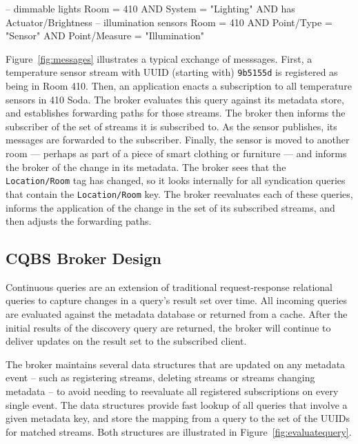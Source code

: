 \begin{sqlcode}
-- dimmable lights
Room = 410 AND System = "Lighting"
AND has Actuator/Brightness
-- illumination sensors
Room = 410 AND Point/Type = "Sensor"
AND Point/Measure = "Illumination"
\end{sqlcode}

Figure~\ref{fig:messages} illustrates a typical exchange of messsages.
First, a temperature sensor stream with UUID (starting with) \texttt{9b5155d} is registered as being in Room 410.
Then, an application enacts a subscription to all temperature sensors in 410 Soda.
The broker evaluates this query against its metadata store, and establishes forwarding paths for those streams.
The broker then informs the subscriber of the set of streams it is subscribed to.
As the sensor publishes, its messages are forwarded to the subscriber.
Finally, the sensor is moved to another room --- perhaps as part of a piece of smart clothing or furniture --- and informs the broker of the change in its metadata.
The broker sees that the \texttt{Location/Room} tag has changed, so it looks internally for all syndication queries that contain the \texttt{Location/Room} key.
The broker reevaluates each of these queries, informs the application of the change in the set of its subscribed streams, and then adjusts the forwarding paths.

\subsection{CQBS Broker Design}

%
Continuous queries are an extension of traditional request-response relational queries to capture changes in a query's result set over time.
All incoming queries are evaluated against the metadata database or returned from a cache.
After the initial results of the discovery query are returned, the broker will continue to deliver updates on the result set to the subscribed client.

The broker maintains several data structures that are updated on any metadata event -- such as registering streams, deleting streams or streams changing metadata -- to avoid needing to reevaluate all registered subscriptions on every single event.
The data structures provide fast lookup of all queries that involve a given metadata key, and store the mapping from a query to the set of the UUIDs for matched streams.
Both structures are illustrated in Figure~\ref{fig:evaluatequery}.


